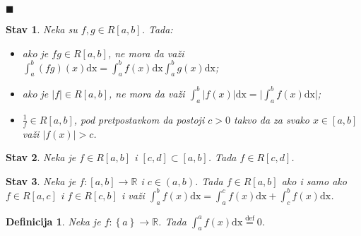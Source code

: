 \documentclass{article}
\newtheorem{definicija}{Definicija}[section]
\newtheorem{stav}{Stav}[section]
\begin{document}
\null\hfill $\blacksquare$\par

\begin{stavbox}
    \label{stav_2.5}
    \begin{stav}
        Neka su $f, g \in R\left[a, b\right]$. Tada:
        \begin{itemize}
            \item ako je $fg \in R\left[a, b\right]$, ne mora da važi $\displaystyle \int^b_a \left(fg\right)\left(x\right)\text{dx} = \int^b_af\left(x\right)\text{dx}  \int^b_ag\left(x\right)\text{dx}$;
            \item ako je $|f|\in R\left[a, b\right]$, ne mora da važi $\displaystyle \int^b_a \big|f\left(x\right)\big|\text{dx} = \bigg|\int^b_a f\left(x\right)\text{dx}\bigg| $;
            \item $\frac{1}{f} \in R\left[a, b\right]$, pod pretpostavkom da postoji $c > 0$ takvo da za svako $x \in \left[a, b\right]$ važi $|f\left(x\right)| > c$.
        \end{itemize}
    \end{stav}
\end{stavbox}

\begin{stavbox}
    \label{stav_2.6}
    \begin{stav}
        Neka je $f\in R\left[a, b\right]$ i $\left[c, d\right] \subset \left[a, b\right]$. Tada $f\in R\left[c,d\right]$.
    \end{stav}
\end{stavbox}

\begin{stavbox}
    \label{stav_2.7}
    \begin{stav}
        Neka je $f:\left[a,b\right] \longrightarrow \mathbb{R}$ i $c \in \left(a, b\right)$. Tada $f\in R\left[a,b\right]$ ako i samo ako $f \in R\left[a, c\right]$ i $f\in R\left[c, b\right]$ i važi
        $\displaystyle\int^b_a f\left(x\right)\text{dx} = \int^c_a f\left(x\right)\text{dx} + \int^b_c f\left(x\right)\text{dx}$.
    \end{stav}
\end{stavbox}

\begin{defbox}
    \label{definicija_2.10}
    \begin{definicija}
        Neka je $f:\left\{a\right\} \longrightarrow \mathbb{R}$. Tada
        $\displaystyle\int^a_a f\left(x\right)\text{dx} \overset{\text{def}}{=} 0$.
    \end{definicija}
\end{defbox}
\end{document}
